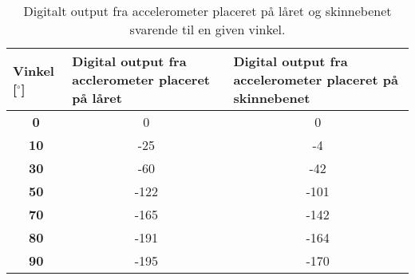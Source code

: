 \begin{table}[H]
\centering
\begin{tabular}{|c|c|c|}
\hline
\multicolumn{1}{|l|}{\textbf{Vinkel {[}$^{\circ}${]}}} & \multicolumn{1}{l|}{\textbf{Digital output fra acclerometer placeret på låret}} & \multicolumn{1}{l|}{\textbf{Digital output fra accelerometer placeret på skinnebenet}} \\ \hline
\textbf{0}                                                      & 0                                                                               & 0                                                                                      \\ \hline
\textbf{10}                                                     & -25                                                                             & -4                                                                                     \\ \hline
\textbf{30}                                                     & -60                                                                             & -42                                                                                    \\ \hline
\textbf{50}                                                     & -122                                                                            & -101                                                                                   \\ \hline
\textbf{70}                                                     & -165                                                                            & -142                                                                                   \\ \hline
\textbf{80}                                                     & -191                                                                            & -164                                                                                   \\ \hline
\textbf{90}                                                     & -195                                                                            & -170                                                                                   \\ \hline
\end{tabular}
\caption{Digitalt output fra accelerometer placeret på låret og skinnebenet svarende til en given vinkel.}
\label{tab:samlet_vinkel_imp}
\end{table}

